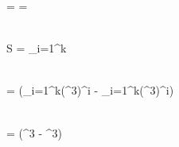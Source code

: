 \varphi =  \hspace{12ex} \psi = 

\\[5ex]

S = \sum_{i=1}^{k}

\\[3ex]

\phantom{x} \hspace{0.2ex} =  (\sum_{i=1}^{k}(\varphi^3)^i - \sum_{i=1}^{k}(\psi^3)^i)

\\[3ex]

\phantom{x} \hspace{0.2ex} =  (\varphi^{3}  - \psi^{3})

\\[8ex]